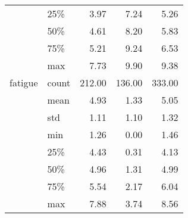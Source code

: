 \begin{tabular}{llrrr}
        & 25\% &    3.97 &    7.24 &    5.26 \\
        & 50\% &    4.61 &    8.20 &    5.83 \\
        & 75\% &    5.21 &    9.24 &    6.53 \\
        & max &    7.73 &    9.90 &    9.38 \\
fatigue & count &  212.00 &  136.00 &  333.00 \\
        & mean &    4.93 &    1.33 &    5.05 \\
        & std &    1.11 &    1.10 &    1.32 \\
        & min &    1.26 &    0.00 &    1.46 \\
        & 25\% &    4.43 &    0.31 &    4.13 \\
        & 50\% &    4.96 &    1.31 &    4.99 \\
        & 75\% &    5.54 &    2.17 &    6.04 \\
        & max &    7.88 &    3.74 &    8.56 \\
\bottomrule
\end{tabular}
